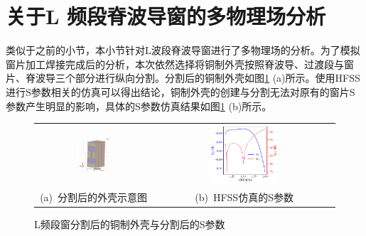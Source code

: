 \documentclass[master]{thesis-uestc}
\begin{document}
\section{关于L 频段脊波导窗的多物理场分析}
类似于之前的小节，本小节针对L波段脊波导窗进行了多物理场的分析。为了模拟窗片加工焊接完成后的分析，本次依然选择将铜制外壳按照脊波导、过渡段与窗片、脊波导三个部分进行纵向分割。分割后的铜制外壳如图\ref{fig:L分割后的铜制外壳} (a)所示。使用HFSS进行S参数相关的仿真可以得出结论，铜制外壳的创建与分割无法对原有的窗片S参数产生明显的影响，具体的S参数仿真结果如图\ref{fig:L分割后的铜制外壳} (b)所示。
\begin{figure}[!htb]
    \small
    \centering
    \begin{tabular}{@{\ }c@{\ }c}
        \includegraphics[width=0.3\textwidth]{pic/chapter4/L频段分割后的铜制外壳.png} & 
        \hspace{5pt}
        \includegraphics[width=0.4\textwidth]{pic/chapter4/L频段分割铜制外壳后的S曲线.png}     \\
        \mbox{\small (a) 分割后的外壳示意图}                                                                               & 
        \mbox{\small (b) HFSS仿真的S参数}                                                                                  \\
    \end{tabular}
    \caption{L频段窗分割后的铜制外壳与分割后的S参数}
    \label{fig:L分割后的铜制外壳}
\end{figure}
\end{document}
